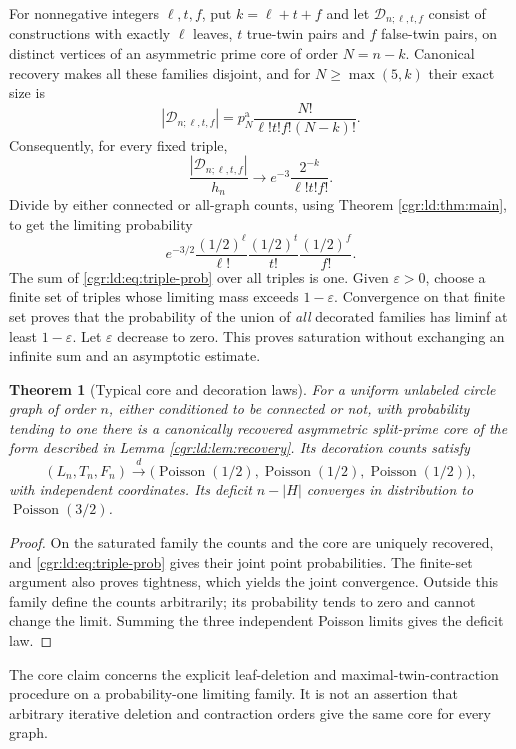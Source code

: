 \documentclass[11pt,letterpaper]{article}
\numberwithin{equation}{section}
\newtheorem{theorem}{Theorem}[section]
\theoremstyle{definition}\newtheorem{definition}[theorem]{Definition}
\theoremstyle{remark}\newtheorem{remark}[theorem]{Remark}
\newcommand{\eps}{\varepsilon}
\DeclareMathOperator{\Poi}{Poisson}
\begin{document}
For nonnegative integers $\ell,t,f$, put $k=\ell+t+f$ and let
$\mathcal D_{n;\ell,t,f}$ consist of constructions with exactly
$\ell$ leaves, $t$ true-twin pairs and $f$ false-twin pairs,
on distinct vertices of an asymmetric prime core of order
$N=n-k$. Canonical recovery makes all these families disjoint,
and for $N\ge\max(5,k)$ their exact size is
\begin{equation}\label{cgr:ld:eq:triple-count}
 |\mathcal D_{n;\ell,t,f}|
 =p_N^{\mathrm a}\frac{N!}{\ell!t!f!(N-k)!}.
\end{equation}
Consequently, for every fixed triple,
\begin{equation}\label{cgr:ld:eq:triple-h}
 \frac{|\mathcal D_{n;\ell,t,f}|}{h_n}
 \longrightarrow e^{-3}\frac{2^{-k}}{\ell!t!f!}.
\end{equation}
Divide by either connected or all-graph counts, using
Theorem \ref{cgr:ld:thm:main}, to get the limiting probability
\begin{equation}\label{cgr:ld:eq:triple-prob}
 e^{-3/2}\frac{(1/2)^\ell}{\ell!}
              \frac{(1/2)^t}{t!}\frac{(1/2)^f}{f!}.
\end{equation}
The sum of \eqref{cgr:ld:eq:triple-prob} over all triples is one.
Given $\eps>0$, choose a finite set of triples whose limiting
mass exceeds $1-\eps$. Convergence on that finite set proves
that the probability of the union of \emph{all} decorated
families has liminf at least $1-\eps$. Let $\eps$ decrease to
zero. This proves saturation without exchanging an infinite sum
and an asymptotic estimate.

\begin{theorem}[Typical core and decoration laws]\label{cgr:ld:thm:core}
For a uniform unlabeled circle graph of order $n$, either
conditioned to be connected or not, with probability tending to
one there is a canonically recovered asymmetric split-prime core
of the form described in Lemma \ref{cgr:ld:lem:recovery}. Its decoration
counts satisfy
\begin{equation}\label{cgr:ld:eq:three-poi}
 (L_n,T_n,F_n)\xrightarrow{d}
 \bigl(\Poi(1/2),\Poi(1/2),\Poi(1/2)\bigr),
\end{equation}
with independent coordinates. Its deficit $n-|H|$ converges in
distribution to $\Poi(3/2)$.
\end{theorem}
\begin{proof}
On the saturated family the counts and the core are uniquely
recovered, and \eqref{cgr:ld:eq:triple-prob} gives their joint point
probabilities. The finite-set argument also proves tightness,
which yields the joint convergence. Outside this family define
the counts arbitrarily; its probability tends to zero and cannot
change the limit. Summing the three independent Poisson limits
gives the deficit law.
\end{proof}
The core claim concerns the explicit leaf-deletion and
maximal-twin-contraction procedure on a probability-one limiting
family. It is not an assertion that arbitrary iterative deletion
and contraction orders give the same core for every graph.
\end{document}
